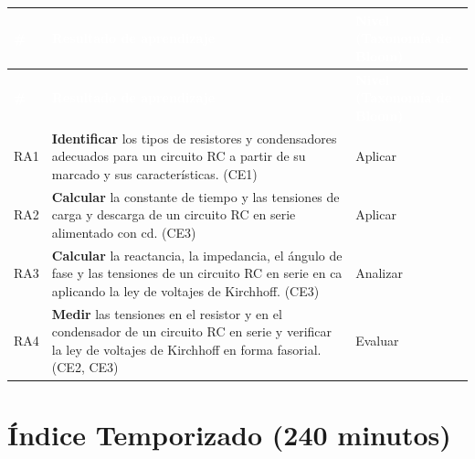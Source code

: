 \documentclass[11pt,letterpaper]{article}
\begin{document}
\begin{xltabular}{\linewidth}{>{\raggedright\arraybackslash}p{1.1cm}>{\raggedright\arraybackslash}X>{\raggedright\arraybackslash}p{3.9cm}}
 \textcolor{white}{\textbf{\#}} & \textcolor{white}{\textbf{Resultado de aprendizaje}} & \textcolor{white}{\textbf{Nivel (Taxonomía de Bloom)}} \\
\endfirsthead
{} \textcolor{white}{\textbf{\#}} & \textcolor{white}{\textbf{Resultado de aprendizaje}} & \textcolor{white}{\textbf{Nivel (Taxonomía de Bloom)}} \\
\endhead
\bottomrule
\endlastfoot
  RA1 & \textbf{Identificar} los tipos de resistores y condensadores adecuados para un circuito RC a partir de su marcado y sus características. (CE1) & Aplicar \\
   RA2 & \textbf{Calcular} la constante de tiempo y las tensiones de carga y descarga de un circuito RC en serie alimentado con cd. (CE3) & Aplicar \\
  RA3 & \textbf{Calcular} la reactancia, la impedancia, el ángulo de fase y las tensiones de un circuito RC en serie en ca aplicando la ley de voltajes de Kirchhoff. (CE3) & Analizar \\
   RA4 & \textbf{Medir} las tensiones en el resistor y en el condensador de un circuito RC en serie y verificar la ley de voltajes de Kirchhoff en forma fasorial. (CE2, CE3) & Evaluar \\
\end{xltabular}

\section{Índice Temporizado (240 minutos)}
\end{document}
